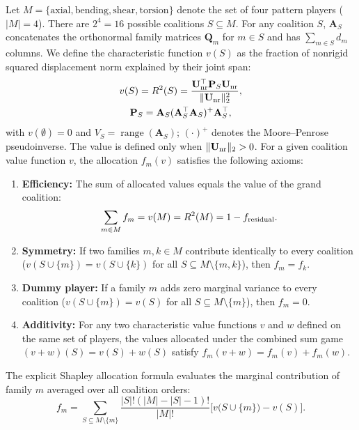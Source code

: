 \documentclass[pdflatex,sn-basic]{sn-jnl}
\begin{document}
Let $M = \{\text{axial}, \text{bending}, \text{shear}, \text{torsion}\}$ denote the set of four pattern players ($|M| = 4$).
There are $2^4 = 16$ possible coalitions $S \subseteq M$.
For any coalition $S$, $\mathbf A_S$ concatenates the orthonormal family matrices $\mathbf Q_m$ for $m\in S$ and has $\sum_{m\in S}d_m$ columns. We define the characteristic function $v(S)$ as the fraction of nonrigid squared displacement norm explained by their joint span:
\begin{equation}
\begin{gathered}
v(S) = R^2(S) = \frac{\mathbf U_{\rm nr}^\top \mathbf P_S \mathbf U_{\rm nr}}{\|\mathbf U_{\rm nr}\|_2^2}, \\
\mathbf P_S = \mathbf A_S (\mathbf A_S^\top \mathbf A_S)^+ \mathbf A_S^\top,
\label{eq:coalition-r2}
\end{gathered}
\end{equation}
with $v(\emptyset)=0$ and $V_S=\operatorname{range}(\mathbf A_S)$; $(\cdot)^+$ denotes the Moore--Penrose pseudoinverse. The value is defined only when $\|\mathbf U_{\rm nr}\|_2>0$.
For a given coalition value function $v$, the allocation $f_m(v)$ satisfies the following axioms:
\begin{enumerate}
\item \textbf{Efficiency:} The sum of allocated values equals the value of the grand coalition:
\begin{equation}
\sum_{m \in M} f_m = v(M) = R^2(M) = 1 - f_{\rm residual}.
\end{equation}
\item \textbf{Symmetry:} If two families $m, k \in M$ contribute identically to every coalition ($v(S \cup \{m\}) = v(S \cup \{k\})$ for all $S \subseteq M \setminus \{m, k\}$), then $f_m = f_k$.
\item \textbf{Dummy player:} If a family $m$ adds zero marginal variance to every coalition ($v(S \cup \{m\}) = v(S)$ for all $S \subseteq M \setminus \{m\}$), then $f_m = 0$.
\item \textbf{Additivity:} For any two characteristic value functions $v$ and $w$ defined on the same set of players, the values allocated under the combined sum game $(v + w)(S) = v(S) + w(S)$ satisfy $f_m(v+w)=f_m(v)+f_m(w)$.
\end{enumerate}
The explicit Shapley allocation formula evaluates the marginal contribution of family $m$ averaged over all coalition orders:
\begin{equation}
f_m = \sum_{S \subseteq M \setminus \{m\}} \frac{|S|!(|M| - |S| - 1)!}{|M|!} \Big[ v\big(S \cup \{m\}\big) - v(S) \Big].
\label{eq:shapley-formula}
\end{equation}
\end{document}
